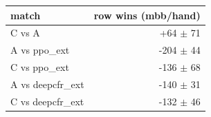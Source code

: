 \begin{tabular}{lr}
\toprule
match & row wins (mbb/hand) \\
\midrule
C vs A & +64 $\pm$ 71 \\
A vs ppo\_ext & -204 $\pm$ 44 \\
C vs ppo\_ext & -136 $\pm$ 68 \\
A vs deepcfr\_ext & -140 $\pm$ 31 \\
C vs deepcfr\_ext & -132 $\pm$ 46 \\
\bottomrule
\end{tabular}
